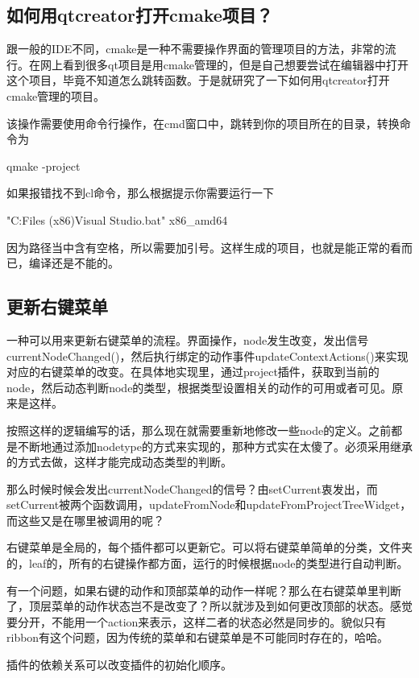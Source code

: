 \subsection{如何用qtcreator打开cmake项目？}
跟一般的IDE不同，cmake是一种不需要操作界面的管理项目的方法，非常的流行。在网上看到很多qt项目是用cmake管理的，但是自己想要尝试在编辑器中打开这个项目，毕竟不知道怎么跳转函数。于是就研究了一下如何用qtcreator打开cmake管理的项目。

该操作需要使用命令行操作，在cmd窗口中，跳转到你的项目所在的目录，转换命令为

qmake -project

如果报错找不到cl命令，那么根据提示你需要运行一下
\begin{listlsting}
"C:\Program Files (x86)\Microsoft Visual Studio\Community\VC\Auxiliary\Build\vcvarsall.bat" x86_amd64    
\end{listlsting}
因为路径当中含有空格，所以需要加引号。这样生成的项目，也就是能正常的看而已，编译还是不能的。

\subsection{更新右键菜单}
一种可以用来更新右键菜单的流程。界面操作，node发生改变，发出信号currentNodeChanged()，然后执行绑定的动作事件updateContextActions()来实现对应的右键菜单的改变。在具体地实现里，通过project插件，获取到当前的node，然后动态判断node的类型，根据类型设置相关的动作的可用或者可见。原来是这样。

按照这样的逻辑编写的话，那么现在就需要重新地修改一些node的定义。之前都是不断地通过添加nodetype的方式来实现的，那种方式实在太傻了。必须采用继承的方式去做，这样才能完成动态类型的判断。

那么时候时候会发出currentNodeChanged的信号？由setCurrent衷发出，而setCurrent被两个函数调用，updateFromNode和updateFromProjectTreeWidget，而这些又是在哪里被调用的呢？

右键菜单是全局的，每个插件都可以更新它。可以将右键菜单简单的分类，文件夹的，leaf的，所有的右键操作都方面，运行的时候根据node的类型进行自动判断。

有一个问题，如果右键的动作和顶部菜单的动作一样呢？那么在右键菜单里判断了，顶层菜单的动作状态岂不是改变了？所以就涉及到如何更改顶部的状态。感觉要分开，不能用一个action来表示，这样二者的状态必然是同步的。貌似只有ribbon有这个问题，因为传统的菜单和右键菜单是不可能同时存在的，哈哈。

插件的依赖关系可以改变插件的初始化顺序。

